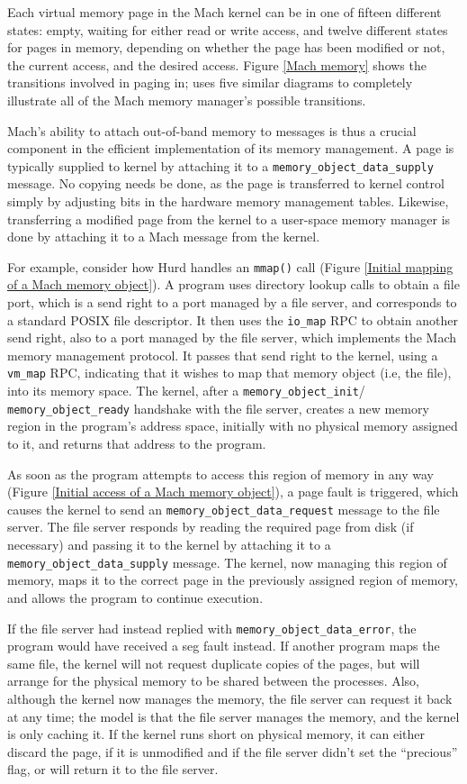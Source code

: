 \documentclass{article}
\def\moinit{{\tt memory_object_init}\xspace}
\def\moready{{\tt memory_object_ready}\xspace}
\def\morequest{{\tt memory_object_data_request}\xspace}
\def\mosupply{{\tt memory_object_data_supply}\xspace}
\def\modataerror{{\tt memory_object_data_error}\xspace}
\begin{document}
Each virtual memory page in the Mach kernel can be in one of fifteen
different states: empty, waiting for either read or write access, and
twelve different states for pages in memory, depending on whether the
page has been modified or not, the current access, and the desired
access.  Figure \ref{Mach memory} shows the transitions involved in
paging in; \cite{principles} uses five similar diagrams to completely
illustrate all of the Mach memory manager's possible transitions.

Mach's ability to attach out-of-band memory to messages is thus a
crucial component in the efficient implementation of its memory
management.  A page is typically supplied to kernel by attaching it to
a \mosupply message.  No copying needs be done, as the
page is transferred to kernel control simply by adjusting bits in the
hardware memory management tables.  Likewise, transferring a modified
page from the kernel to a user-space memory manager is done by
attaching it to a Mach message from the kernel.

For example, consider how Hurd handles an {\tt mmap()} call (Figure
\ref{Initial mapping of a Mach memory object}).  A program uses
directory lookup calls to obtain a file port, which is a send right to
a port managed by a file server, and corresponds to a standard POSIX
file descriptor.  It then uses the {\tt io_map} RPC to obtain another
send right, also to a port managed by the file server, which
implements the Mach memory management protocol.  It passes that send
right to the kernel, using a {\tt vm_map} RPC, indicating that it
wishes to map that memory object (i.e, the file), into its memory
space.  The kernel, after a \moinit / \moready handshake with the file
server, creates a new memory region in the program's address space,
initially with no physical memory assigned to it, and returns that
address to the program.

As soon as the program attempts to access this region of memory in any
way (Figure \ref{Initial access of a Mach memory object}), a page
fault is triggered, which causes the kernel to send an \morequest
message to the file server.  The file server responds by reading the
required page from disk (if necessary) and passing it to the kernel by
attaching it to a \mosupply message.  The kernel, now managing this
region of memory, maps it to the correct page in the previously
assigned region of memory, and allows the program to continue
execution.

If the file server had instead replied with \modataerror, the program
would have received a seg fault instead.  If another program maps the
same file, the kernel will not request duplicate copies of the pages,
but will arrange for the physical memory to be shared between the
processes.  Also, although the kernel now manages the memory, the file
server can request it back at any time; the model is that the file
server manages the memory, and the kernel is only caching it.  If the
kernel runs short on physical memory, it can either discard the page,
if it is unmodified and if the file server didn't set the ``precious''
flag, or will return it to the file server.
\end{document}
